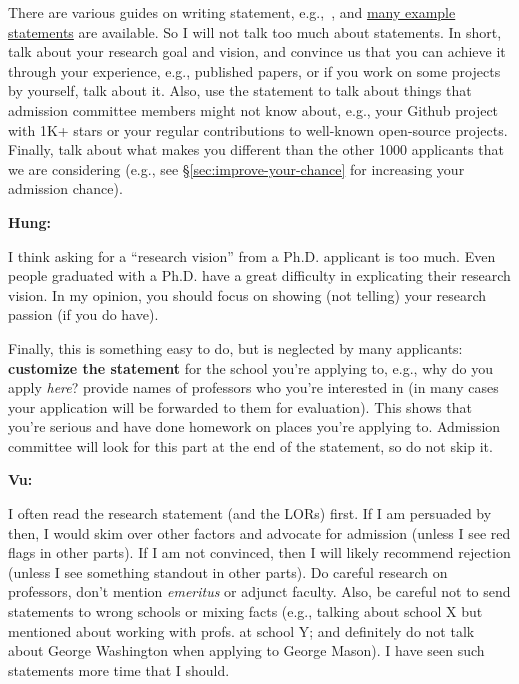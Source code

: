 \documentclass[oneside,11pt]{memoir}
\newenvironment{commentbox}[1][]{
\small
    \begin{mybox}
    {\small \textbf{#1}}
 }{
   \end{mybox}
}
\begin{document}
There are various guides on writing statement, e.g.,~\cite{blattman2022writing}, and \href{https://cs-sop.org/}{many example statements} are available. So I will not talk too much about statements. In short, talk about your research goal and vision, and convince us that you can achieve it through your experience, e.g., published papers, or if you work on some projects by yourself, talk about it. Also, use the statement to talk about things that admission committee members might not know about, e.g., your Github project with 1K+ stars or your regular contributions to well-known open-source projects. Finally, talk about what makes you different than the other 1000 applicants that we are considering (e.g., see \S\ref{sec:improve-your-chance} for increasing your admission chance).



\begin{commentbox}[Hung:]
I think asking for a “research vision” from a Ph.D. applicant is too much. Even people graduated with a Ph.D. have a great difficulty in explicating their research vision. In my opinion, you should focus on showing (not telling) your research passion (if you do have).
\end{commentbox}

Finally, this is something easy to do, but is neglected by many
applicants: \textbf{customize the statement} for the school you're applying to,
e.g., why do you apply \emph{here}? provide names of professors who you're interested in (in many cases your application will be forwarded to them for evaluation).
This shows that you're serious and have done homework on places you're applying to.
Admission committee will look for this part at the end of the statement, so do not skip it.



\begin{commentbox}[Vu:]
I often read the research statement (and the LORs) first. If I am
persuaded by then, I would skim over other factors and advocate for
admission (unless I see red flags in other parts). If I am not
convinced, then I will likely recommend rejection (unless I see
something standout in other parts).
\tcblower
Do careful research on professors, don't mention \emph{emeritus} or  adjunct faculty. 
Also, be careful not to send statements to wrong schools or mixing
facts (e.g., talking about school X but mentioned about working with
profs. at school Y; and definitely do not talk about George Washington when applying to George Mason). I have seen such statements more time that I
should.
\end{commentbox}
\end{document}
